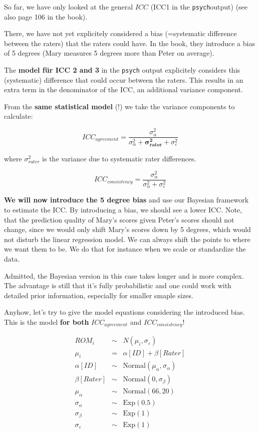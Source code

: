 \documentclass[
]{article}
\begin{document}
So far, we have only looked at the general \textbf{\(ICC\)} (ICC1 in the \texttt{psych}output)
(see also page 106 in the book).

There, we have not yet explicitely considered a bias (=systematic difference
between the raters) that the raters could have. In the book,
they introduce a bias of 5 degrees (Mary measures 5 degrees more than Peter on average).

The \textbf{model für ICC 2 and 3} in the \texttt{psych} output explicitely considers this
(systematic) difference that could occur between the raters.
This results in an extra term in the denominator
of the ICC, an additional variance component.

From the \textbf{same statistical model} (!) we take the variance components to calculate:

\[ICC_{agreement} = \frac{\sigma_{\alpha}^2}{\sigma_{\alpha}^2 + \mathbf{\sigma_{rater}^2} + \sigma_{\varepsilon}^2}\]

where \(\sigma_{rater}^2\) is the variance due to systematic rater differences.

\[ICC_{consistency} = \frac{\sigma_{\alpha}^2}{\sigma_{\alpha}^2 + \sigma_{\varepsilon}^2}\]

\textbf{We will now introduce the 5 degree bias} and use our Bayesian
framework to estimate the ICC.
By introducing a bias, we should see
a lower ICC. Note, that the prediction quality of Mary's scores
given Peter's scores should not change, since we would only shift Mary's scores
down by 5 degrees, which would not disturb the linear regression model. We can
always shift the points to where we want them to be. We do that for instance
when we scale or standardize the data.

Admitted, the Bayesian version in this case takes longer and is more complex.
The advantage is still that it's fully probabilistic and one could work with
detailed prior information, especially for smaller smaple sizes.

Anyhow, let's try to give the model equations considering
the introduced bias. This is the model \textbf{for both}
\(ICC_{agreement}\) and \(ICC_{consistency}\)!

\[
\begin{array}{rcl}
ROM_i &\sim& N(\mu_i, \sigma_{\varepsilon}) \\
\mu_i &=& \alpha[ID] + \beta[Rater] \\
\alpha[ID] &\sim& \text{Normal}(\mu_{\alpha}, \sigma_{\alpha}) \\
\beta[Rater] &\sim& \text{Normal}(0, \sigma_{\beta}) \\
\mu_{\alpha} &\sim& \text{Normal}(66, 20) \\
\sigma_{\alpha} &\sim& \text{Exp}(0.5) \\
\sigma_{\beta} &\sim& \text{Exp}(1) \\
\sigma_{\varepsilon} &\sim& \text{Exp}(1)
\end{array}
\]
\end{document}
